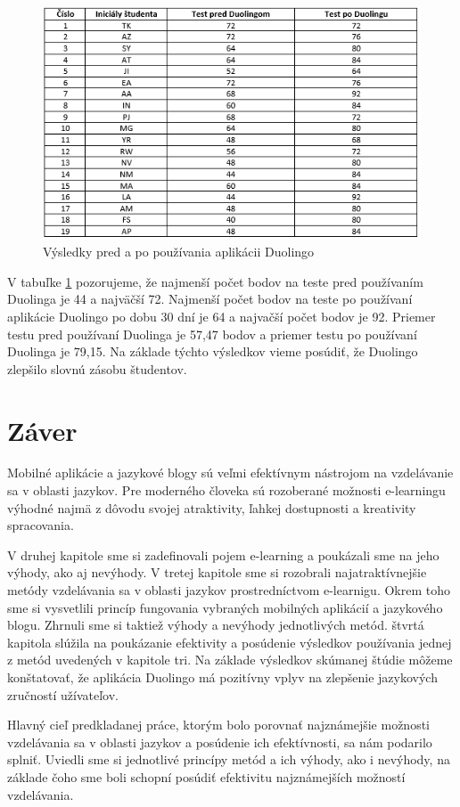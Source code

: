 \documentclass[10pt,oneside,slovak,a4paper]{article}
\begin{document}
\begin{figure}[h] %
\centering
\includegraphics{duo_studium.png}
\caption{Výsledky pred a po používania aplikácii Duolingo\cite{duolingo}}
\label{duo-studium}
\end{figure}

V tabuľke \ref{duo-studium} pozorujeme, že najmenší počet bodov na teste pred používaním Duolinga je 44 a najväčší 72. Najmenší počet bodov na teste po používaní aplikácie  Duolingo po dobu 30 dní je 64 a najvačší počet bodov je 92. Priemer testu pred používaní Duolinga je 57,47 bodov a priemer testu po používaní Duolinga je 79,15. \cite{duolingo} Na základe týchto výsledkov vieme posúdiť, že Duolingo zlepšilo slovnú zásobu študentov.

\section{Záver}
Mobilné aplikácie a jazykové blogy sú veľmi efektívnym nástrojom na vzdelávanie sa v oblasti jazykov. Pre moderného človeka sú rozoberané možnosti e-learningu výhodné najmä z dôvodu svojej atraktivity, ľahkej dostupnosti a kreativity spracovania.

V druhej kapitole sme si zadefinovali pojem e-learning a poukázali sme na jeho výhody, ako aj nevýhody. V tretej kapitole sme si rozobrali najatraktívnejšie metódy vzdelávania sa v oblasti jazykov prostredníctvom e-learnigu. Okrem toho sme si vysvetlili princíp fungovania vybraných mobilných aplikácií a jazykového blogu. Zhrnuli sme si taktiež výhody a nevýhody jednotlivých metód. štvrtá kapitola slúžila na poukázanie efektivity a posúdenie výsledkov používania jednej z metód uvedených v kapitole tri. Na základe výsledkov skúmanej štúdie môžeme konštatovať, že aplikácia Duolingo má pozitívny vplyv na zlepšenie jazykových zručností užívateľov. 

Hlavný cieľ predkladanej práce, ktorým bolo porovnať najznámejšie možnosti vzdelávania sa v oblasti jazykov a posúdenie ich efektívnosti, sa nám podarilo splniť. Uviedli sme si jednotlivé princípy metód a ich výhody, ako i nevýhody, na základe čoho sme boli schopní posúdiť efektivitu najznámejších možností vzdelávania.



\end{document}
